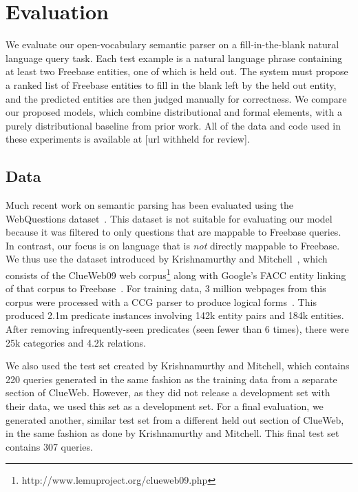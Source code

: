 \documentclass[11pt,letterpaper]{article}
\begin{document}
\section{Evaluation}
\label{sec:evaluation}

We evaluate our open-vocabulary semantic parser on a fill-in-the-blank natural language query task.
Each test example is a natural language phrase containing at least two Freebase entities, one of
which is held out.  The system must propose a ranked list of Freebase entities to fill in the blank
left by the held out entity, and the predicted entities are then judged manually for correctness.
We compare our proposed models, which combine distributional and formal elements, with a purely
distributional baseline from prior work.  All of the data and code used in these experiments is
available at [url withheld for review].

\subsection{Data}

Much recent work on semantic parsing has been evaluated using the WebQuestions
dataset~\cite{berant-2013-semantic-parsing-qa}.  This dataset is not suitable for evaluating our
model because it was filtered to only questions that are mappable to Freebase queries.  In
contrast, our focus is on language that is \emph{not} directly mappable to Freebase.  We thus use
the dataset introduced by Krishnamurthy and
Mitchell~, which consists of the ClueWeb09
web corpus\footnote{http://www.lemuproject.org/clueweb09.php} along with Google's FACC entity
linking of that corpus to Freebase~\cite{gabrilovich-2013-clueweb-entity-linking}.  For training
data, 3 million webpages from this corpus were processed with a CCG parser to produce logical
forms~\cite{krishnamurthy-2014-joint-ccg}.  This produced 2.1m predicate instances involving 142k
entity pairs and 184k entities.  After removing infrequently-seen predicates (seen fewer than 6
times), there were 25k categories and 4.2k relations.

We also used the test set created by Krishnamurthy and Mitchell, which contains 220 queries
generated in the same fashion as the training data from a separate section of ClueWeb.  However, as
they did not release a development set with their data, we used this set as a development set.  For
a final evaluation, we generated another, similar test set from a different held out section of
ClueWeb, in the same fashion as done by Krishnamurthy and Mitchell.  This final test set contains
307 queries.
\end{document}
